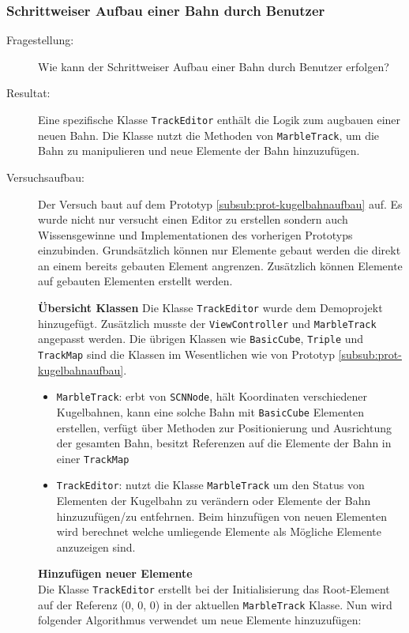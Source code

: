 \subsubsection{Schrittweiser Aufbau einer Bahn durch Benutzer}\label{subsub:prot-kugelbahneditor}
\begin{description}
	\item[Fragestellung:] Wie kann der Schrittweiser Aufbau einer Bahn durch Benutzer erfolgen?
	\item[Resultat:] Eine spezifische Klasse \texttt{TrackEditor} enthält die Logik zum augbauen einer neuen Bahn. Die Klasse nutzt die Methoden von \texttt{MarbleTrack}, um die Bahn zu manipulieren und neue Elemente der Bahn hinzuzufügen.
	\item[Versuchsaufbau:] Der Versuch baut auf dem Prototyp \ref{subsub:prot-kugelbahnaufbau} auf. Es wurde nicht nur versucht einen Editor zu erstellen sondern auch Wissensgewinne und Implementationen des vorherigen Prototyps einzubinden. Grundsätzlich können nur Elemente gebaut werden die direkt an einem bereits gebauten Element angrenzen. Zusätzlich können Elemente auf gebauten Elementen erstellt werden. 

	\textbf{Übersicht Klassen}
	Die Klasse \texttt{TrackEditor} wurde dem Demoprojekt hinzugefügt. Zusätzlich musste der \texttt{ViewController} und \texttt{MarbleTrack} angepasst werden. Die übrigen Klassen wie \texttt{BasicCube}, \texttt{Triple} und \texttt{TrackMap} sind die Klassen im Wesentlichen wie von Prototyp \ref{subsub:prot-kugelbahnaufbau}.
	\begin{itemize}
		\item \texttt{MarbleTrack}: erbt von \texttt{SCNNode}, hält Koordinaten verschiedener Kugelbahnen, kann eine solche Bahn mit \texttt{BasicCube} Elementen erstellen, verfügt über Methoden zur Positionierung und Ausrichtung der gesamten Bahn, besitzt Referenzen auf die Elemente der Bahn in einer \texttt{TrackMap}
		\item \texttt{TrackEditor}: nutzt die Klasse \texttt{MarbleTrack} um den Status von Elementen der Kugelbahn zu verändern oder Elemente der Bahn hinzuzufügen/zu entfehrnen. Beim hinzufügen von neuen Elementen wird berechnet welche umliegende Elemente als Mögliche Elemente anzuzeigen sind.
	\end{itemize}

	\textbf{Hinzufügen neuer Elemente}\\
	Die Klasse \texttt{TrackEditor} erstellt bei der Initialisierung das Root-Element auf der Referenz (0, 0, 0) in der aktuellen \texttt{MarbleTrack} Klasse. Nun wird folgender Algorithmus verwendet um neue Elemente hinzuzufügen:
	

\end{description}
